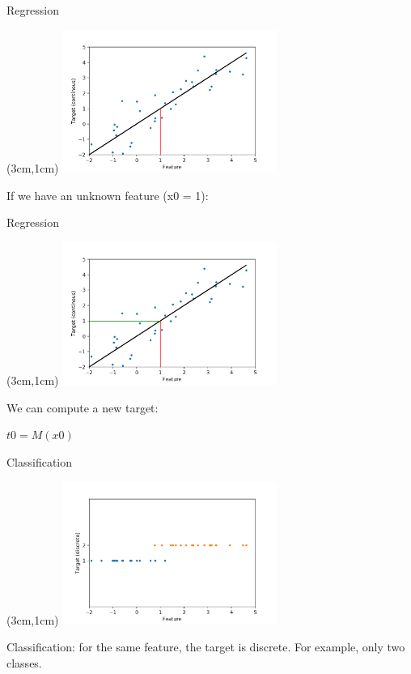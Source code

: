 \documentclass[handout, 10pt]{beamer}
\begin{document}
\begin{frame}{Regression}
\begin{textblock*}{8cm}(3cm,1cm) %
\includegraphics[width=7cm]{figs/regression_2.png}

If we have an unknown feature (x0 = 1): 
\end{textblock*}
\end{frame}

\begin{frame}{Regression}
\begin{textblock*}{8cm}(3cm,1cm) %
\includegraphics[width=7cm]{figs/regression_3.png}

We can compute a new target:

$t0 = M(x0)$
\end{textblock*}
\end{frame}

\begin{frame}{Classification}
\begin{textblock*}{8cm}(3cm,1cm) %
\includegraphics[width=7cm]{figs/classification_0.png}

Classification: for the same feature, the target is discrete. For example, only two classes.
\end{textblock*}
\end{frame}
\end{document}
